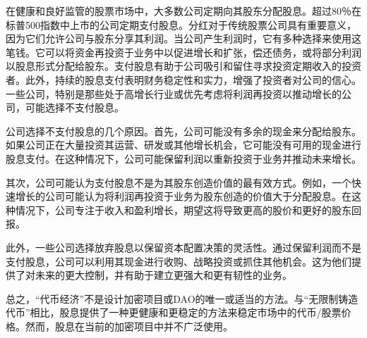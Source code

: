 \documentclass[main.tex]{subfiles}
\begin{document}
在健康和良好监管的股票市场中，大多数公司定期向其股东分配股息。超过80％在标普500指数中上市的公司定期支付股息。分红对于传统股票公司具有重要意义，因为它们允许公司与股东分享其利润。当公司产生利润时，它有多种选择来使用这笔钱。它可以将资金再投资于业务中以促进增长和扩张，偿还债务，或将部分利润以股息形式分配给股东。支付股息有助于公司吸引和留住寻求投资定期收入的投资者。此外，持续的股息支付表明财务稳定性和实力，增强了投资者对公司的信心。一些公司，特别是那些处于高增长行业或优先考虑将利润再投资以推动增长的公司，可能选择不支付股息。

公司选择不支付股息的几个原因。首先，公司可能没有多余的现金来分配给股东。如果公司正在大量投资其运营、研发或其他增长机会，它可能没有可用的现金进行股息支付。在这种情况下，公司可能保留利润以重新投资于业务并推动未来增长。

其次，公司可能认为支付股息不是为其股东创造价值的最有效方式。例如，一个快速增长的公司可能认为将利润再投资于业务为股东创造的价值大于分配股息。在这种情况下，公司专注于收入和盈利增长，期望这将导致更高的股价和更好的股东回报。

此外，一些公司选择放弃股息以保留资本配置决策的灵活性。通过保留利润而不是支付股息，公司可以利用其现金进行收购、战略投资或抓住其他机会。这为他们提供了对未来的更大控制，并有助于建立更强大和更有韧性的业务。

总之，“代币经济”不是设计加密项目或DAO的唯一或适当的方法。与“无限制铸造代币”相比，股息提供了一种更健康和更稳定的方法来稳定市场中的代币/股票价格。然而，股息在当前的加密项目中并不广泛使用。
\end{document}

